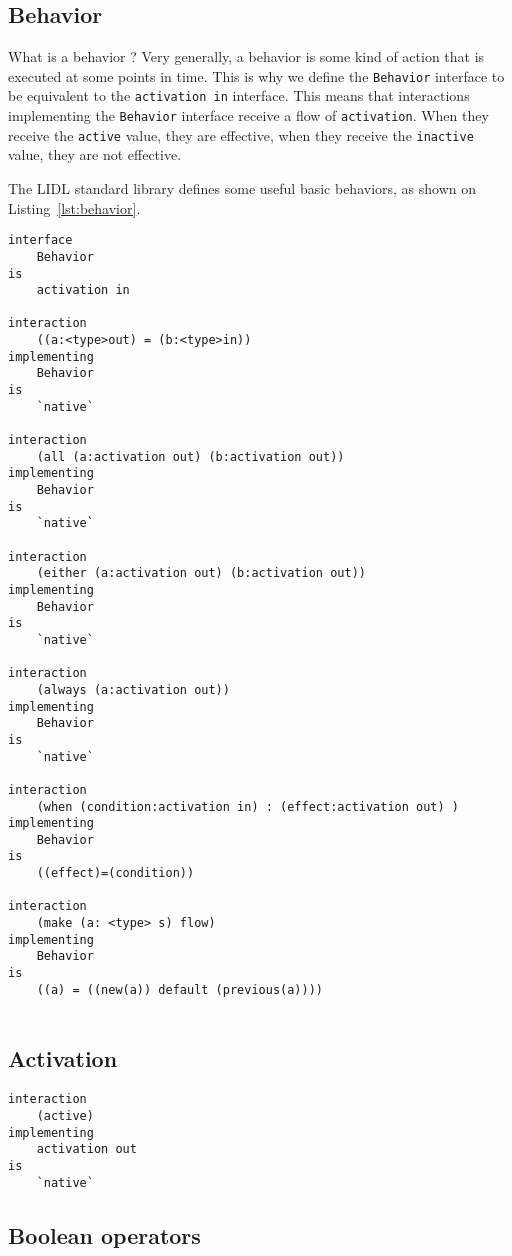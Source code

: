 \subsection{Behavior}
What is a behavior ? Very generally, a behavior is some kind of action that is executed at some points in time. This is why we define the \lstinline{Behavior} interface to be equivalent to the \lstinline{activation in} interface. This means that interactions implementing the \lstinline{Behavior} interface receive a flow of \lstinline{activation}. When they receive the \lstinline{active} value, they are effective, when they receive the \lstinline{inactive} value, they are not effective. 

The LIDL standard library defines some useful basic behaviors, as shown on Listing~\ref{lst:behavior}.

\begin{lstlisting}[caption=Section of the standard LIDL library regarding Behaviors,label={lst:behavior}]
interface 
	Behavior 
is
	activation in

interaction 
	((a:<type>out) = (b:<type>in))
implementing
	Behavior
is 
	`native`

interaction 
	(all (a:activation out) (b:activation out))
implementing 
	Behavior
is
	`native`
	
interaction 
	(either (a:activation out) (b:activation out))
implementing 
	Behavior
is
	`native`
	
interaction 
	(always (a:activation out))
implementing 
	Behavior
is
	`native`
	
interaction
	(when (condition:activation in) : (effect:activation out) )
implementing
	Behavior
is
	((effect)=(condition))

interaction 
	(make (a: <type> s) flow)
implementing
	Behavior
is
	((a) = ((new(a)) default (previous(a))))
  
\end{lstlisting}


\subsection{Activation}


\begin{lstlisting}
interaction
	(active)
implementing
	activation out
is
	`native`
\end{lstlisting}



\subsection{Boolean operators}

